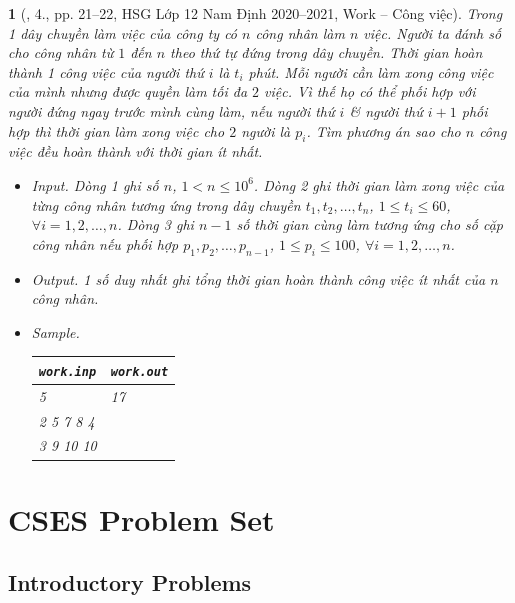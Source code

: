 \documentclass{article}
\newtheorem{baitoan}{}
\begin{document}
\begin{baitoan}[\cite{Trung_HSG_THPT_Tin}, 4., pp. 21--22, HSG Lớp 12 Nam Định 2020--2021, Work -- Công việc]
	Trong 1 dây chuyền làm việc của công ty có $n$ công nhân làm $n$ việc. Người ta đánh số cho công nhân từ $1$ đến $n$ theo thứ tự đứng trong dây chuyền. Thời gian hoàn thành 1 công việc của người thứ $i$ là $t_i$ phút. Mỗi người cần làm xong công việc của mình nhưng được quyền làm tối đa $2$ việc. Vì thế họ có thể phối hợp với người đứng ngay trước mình cùng làm, nếu người thứ $i$ \& người thứ $i + 1$ phối hợp thì thời gian làm xong việc cho $2$ người là $p_i$. Tìm phương án sao cho $n$ công việc đều hoàn thành với thời gian ít nhất.
	\begin{itemize}
		\item {\sf Input.} Dòng 1 ghi số $n$, $1 < n\le10^6$. Dòng 2 ghi thời gian làm xong việc của từng công nhân tương ứng trong dây chuyền $t_1,t_2,\ldots,t_n$, $1\le t_i\le60$, $\forall i = 1,2,\ldots,n$. Dòng 3 ghi $n - 1$ số thời gian cùng làm tương ứng cho số cặp công nhân nếu phối hợp $p_1,p_2,\ldots,p_{n-1}$, $1\le p_i\le100$, $\forall i = 1,2,\ldots,n$.
		\item {\sf Output.} 1 số duy nhất ghi tổng thời gian hoàn thành công việc ít nhất của $n$ công nhân.
		\item {\sf Sample.}
		\begin{table}[H]
			\centering
			\begin{tabular}{|l|l|}
				\hline
				\verb|work.inp| & \verb|work.out| \\
				\hline
				5 & 17 \\
				2 5 7 8 4 & \\
				3 9 10 10 & \\
				\hline
			\end{tabular}
		\end{table}
	\end{itemize}
\end{baitoan}


\section{CSES Problem Set}

\subsection{Introductory Problems}
\end{document}
